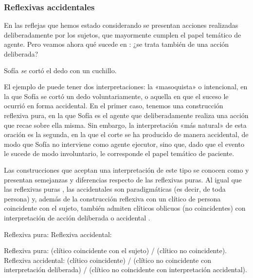 \subsubsection{Reflexivas accidentales}\label{sec:10-accidentales}

En las reflejas que hemos estado considerando se presentan acciones realizadas
deliberadamente por los sujetos, que mayormente cumplen el papel temático de
agente. Pero veamos ahora qué sucede en : ¿se trata también
de una acción deliberada?

\begin{exe}
  \ex\label{ex:10-dedo} Sofía \textit{se} cortó el dedo con un cuchillo.
\end{exe}

El ejemplo de  puede tener dos interpretaciones: la
«masoquista» o intencional, en la que Sofía se cortó un dedo voluntariamente, o
aquella en que el suceso le ocurrió en forma accidental. En el primer caso,
tenemos una construcción reflexiva pura, en la que Sofía es el agente que
deliberadamente realiza una acción que recae sobre ella misma. Sin embargo, la
interpretación «más natural» de esta oración es la segunda, en la que el corte
se ha producido de manera accidental, de modo que Sofía no interviene como
agente ejecutor, sino que, dado que el evento le sucede de modo involuntario, le
corresponde el papel temático de paciente.

Las construcciones que aceptan una interpretación de este tipo se conocen como
 y presentan semejanzas y diferencias respecto
de las reflexivas puras. Al igual que las reflexivas puras
, las accidentales son paradigmáticas (es decir, de
toda persona)  y, además de la construcción reflexiva
con un clítico de persona coincidente con el sujeto, también admiten clíticos
oblicuos (no coincidentes) con interpretación de acción deliberada o accidental
.

\begin{exe}
  \ex\label{ex:10-paradigma}
    \begin{xlist}
      \ex\label{ex:10-paradigma-a} Reflexiva pura: 
      \ex\label{ex:10-paradigma-b} Reflexiva accidental: 
    \end{xlist}
  \ex\label{ex:10-oblicuo}
    \begin{xlist}
      \ex Reflexiva pura:  (clítico coincidente con el sujeto) /
           (clítico no coincidente).
      \ex Reflexiva accidental:  (clítico coincidente) /
           (clítico no coincidente con
          interpretación deliberada) / 
          (clítico no coincidente con interpretación accidental).
    \end{xlist}
\end{exe}

